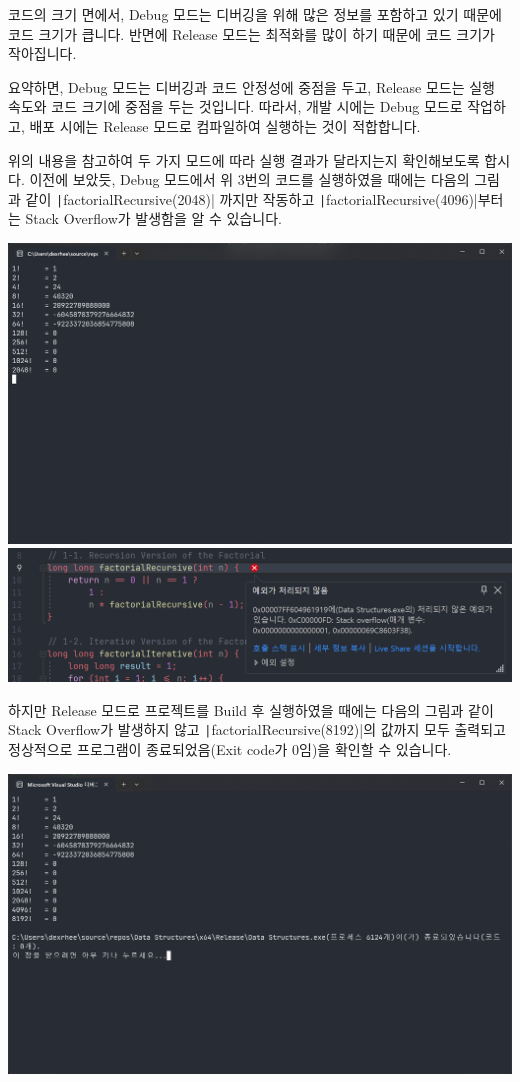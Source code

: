코드의 크기 면에서,
Debug 모드는 디버깅을 위해 많은 정보를 포함하고 있기 때문에 코드 크기가 큽니다.
반면에 Release 모드는 최적화를 많이 하기 때문에 코드 크기가 작아집니다.

요약하면, Debug 모드는 디버깅과 코드 안정성에 중점을 두고, Release 모드는 실행 속도와 코드 크기에 중점을 두는 것입니다.
따라서, 개발 시에는 Debug 모드로 작업하고, 배포 시에는 Release 모드로 컴파일하여 실행하는 것이 적합합니다.

위의 내용을 참고하여 두 가지 모드에 따라 실행 결과가 달라지는지 확인해보도록 합시다.
이전에 보았듯,
Debug 모드에서 위 3번의 코드를 실행하였을 때에는 다음의 그림과 같이 \texttt|factorialRecursive(2048)| 까지만 작동하고
\texttt|factorialRecursive(4096)|부터는 Stack Overflow가 발생함을 알 수 있습니다.

\includegraphics[width=\textwidth]{./img/3-1.png}
\includegraphics[width=\textwidth]{./img/3-2.png}

하지만 Release 모드로 프로젝트를 Build 후 실행하였을 때에는 다음의 그림과 같이 Stack Overflow가 발생하지 않고
\texttt|factorialRecursive(8192)|의 값까지 모두 출력되고 정상적으로 프로그램이 종료되었음(Exit code가 0임)을 확인할 수 있습니다.

\includegraphics[width=\textwidth]{./img/5-4.png}

